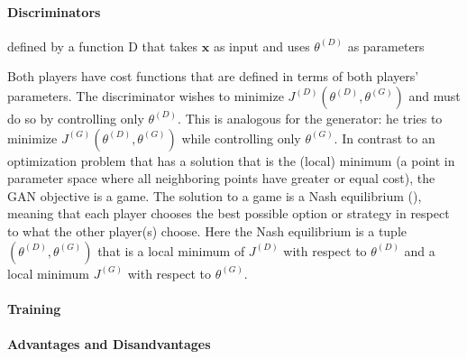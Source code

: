 \paragraph{Discriminators}
defined by a function D that takes $\mathbf{x}$ as input and uses $\theta^{(D)}$ as parameters

Both players have cost functions that are defined in terms of both players' parameters. The discriminator  wishes to minimize $J^{(D)}(\theta^{(D)}, \theta^{(G)})$ and must do so by controlling only $\theta^{(D)}$. This is analogous for the generator: he tries to minimize $J^{(G)}(\theta^{(D)}, \theta^{(G)})$ while controlling only $\theta^{(G)}$. In contrast to an optimization problem that has a solution that is the (local) minimum (a point in parameter space where all neighboring points have greater or equal cost), the GAN objective is a game. The solution to a game is a Nash equilibrium (), meaning that each player chooses the best possible option or strategy in respect to what the other player(s) choose. Here the Nash equilibrium is a tuple $(\theta^{(D)}, \theta^{(G)})$ that is a local minimum of $J^{(D)}$ with respect to $\theta^{(D)}$ and a local minimum $J^(G)$ with respect to $\theta^{(G)}$.
\paragraph{Training}

\paragraph{Advantages and Disandvantages}